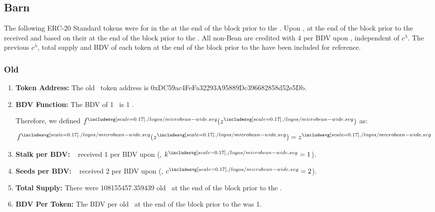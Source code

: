 \documentclass[class=article, crop=false]{standalone}
\begin{document}

\subsection{Barn}
\vspace*{-1.5mm}

The following ERC-20 Standard tokens were  for  in the  at the end of the block prior to the . Upon ,  at the end of the block prior to the  received  and  based on their  at the end of the block prior to the . All non-Bean  are credited with 4  per BDV upon , independent of \hyperlink{ht32}{$c^{\lambda}$}. The previous \hyperlink{ht32}{$c^{\lambda}$}, total supply and BDV of each token at the end of the block prior to the  have been included for reference. 

\vspace*{-1.5mm}
\subsubsection{Old \Bean}
\vspace*{-1.5mm}

\begin{enumerate}
    \item \textbf{Token Address:} The old \Bean\ token address is 0xDC59ac4FeFa32293A95889Dc396682858d52e5Db.
    
    \item \textbf{BDV Function:} The BDV of 1 \Bean\ is 1 \Bean. 
        
        Therefore, we defined $f^{\bean}(z^{\bean})$ as:
        
            $$
                f^{\bean}(z^{\bean}) = z^{\bean}
            $$
            
    \item \textbf{Stalk per BDV:} \Bean\  received 1  per BDV upon  (, $k^{\bean} = 1$).
    
    \item \textbf{Seeds per BDV:} \Bean\  received 2  per BDV upon  (, $c^{\bean} = 2$).
    
    \item \textbf{Total Supply:} There were 108155457.359439 old \Bean\ at the end of the block prior to the .
    
    \item \textbf{BDV Per Token:} The BDV per old \Bean\ at the end of the block prior to the  was 1.
\end{enumerate}
\end{document}
